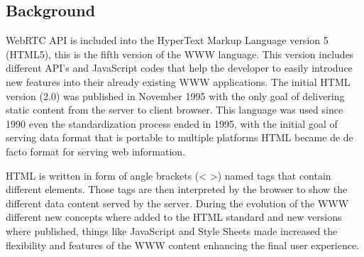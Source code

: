 %
%
%
%
%
\subsection{Background}

WebRTC API is included into the HyperText Markup Language version 5 (HTML5), this is the fifth version of the WWW language. This version includes different API's and JavaScript codes that help the developer to easily introduce new features into their already existing WWW applications. The initial HTML version (2.0) was published in November 1995 \cite{html2IETF} with the only goal of delivering static content from the server to client browser. This language was used since 1990 even the standardization process ended in 1995, with the initial goal of serving data format that is portable to multiple platforms HTML became de de facto format for serving web information. 

HTML is written in form of angle brackets (< >) named tags that contain different elements. Those tags are then interpreted by the browser to show the different data content served by the server. During the evolution of the WWW different new concepts where added to the HTML standard and new versions where published, things like JavaScript and Style Sheets made increased the flexibility and features of the WWW content enhancing the final user experience.

